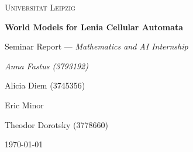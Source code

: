 \documentclass[11pt,a4paper]{scrartcl}
\begin{document}
\begin{titlepage}
    \centering
    {\scshape\LARGE Universität Leipzig \par}
    \vspace{1cm}
    {\huge\bfseries World Models for Lenia Cellular Automata \par}
    \vspace{1.5cm}
    {\LARGE Seminar Report — \textit{Mathematics and AI Internship}\par}
    \vspace{2cm}
    {\Large\itshape
        Anna Fastus (3793192) \par \vspace{4pt}
        Alicia Diem (3745356) \par \vspace{4pt}
        Eric Minor \par \vspace{4pt}
        Theodor Dorotsky (3778660) \par}
    \vfill
    {\large \today \par}
\end{titlepage}

\tableofcontents

\clearpage
{}
\setcounter{page}{1}


\clearpage
\printbibliography[heading=bibintoc, title={References}]
\end{document}
